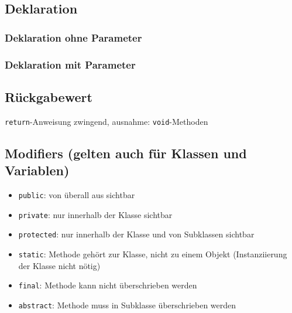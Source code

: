 \subsection{Deklaration}
\vspace{-2mm}
\begin{minipage}[t]{0.49\columnwidth}
    \subsubsection{Deklaration ohne Parameter}
    
\end{minipage}\hfill
\begin{minipage}[t]{0.5\columnwidth}
    \subsubsection{Deklaration mit Parameter}
    
\end{minipage}

\subsection{Rückgabewert}
\lstinline{return}-Anweisung zwingend, ausnahme: \lstinline{void}-Methoden

\subsection{Modifiers (gelten auch für Klassen und Variablen)}
\begin{itemize}
    \item \lstinline{public}: von überall aus sichtbar
    \item \lstinline{private}: nur innerhalb der Klasse sichtbar
    \item \lstinline{protected}: nur innerhalb der Klasse und von Subklassen sichtbar
    \item \lstinline{static}: Methode gehört zur Klasse, nicht zu einem Objekt (Instanziierung der Klasse nicht nötig)
    \item \lstinline{final}: Methode kann nicht überschrieben werden
    \item \lstinline{abstract}: Methode muss in Subklasse überschrieben werden
\end{itemize}
